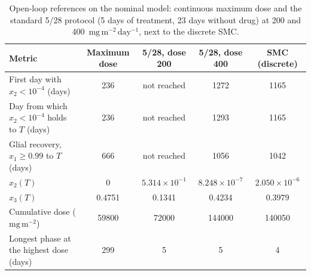 \begin{table}[htbp]
\centering
\caption{Open-loop references on the nominal model: continuous maximum dose and the standard 5/28 protocol (5 days of treatment, 23 days without drug) at 200 and 400~$\mathrm{mg\,m^{-2}\,day^{-1}}$, next to the discrete SMC.}
\label{tab:open_loop_protocols}
\small
\begin{tabular}{lcccc}
\toprule
Metric & Maximum dose & 5/28, dose 200 & 5/28, dose 400 & SMC (discrete) \\
\midrule
First day with $x_2<10^{-4}$ (days) & 236 & not reached & 1272 & 1165 \\
Day from which $x_2<10^{-4}$ holds to $T$ (days) & 236 & not reached & 1293 & 1165 \\
Glial recovery, $x_1\ge 0.99$ to $T$ (days) & 666 & not reached & 1056 & 1042 \\
$x_2(T)$ & $0$ & $5.314{\times}10^{-1}$ & $8.248{\times}10^{-7}$ & $2.050{\times}10^{-6}$ \\
$x_3(T)$ & 0.4751 & 0.1341 & 0.4234 & 0.3979 \\
Cumulative dose ($\mathrm{mg\,m^{-2}}$) & 59800 & 72000 & 144000 & 140050 \\
Longest phase at the highest dose (days) & 299 & 5 & 5 & 4 \\
\bottomrule
\end{tabular}
\end{table}
